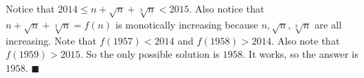 
Notice that $2014\le n+\sqrt{n}+\sqrt[3]{n}<2015$. Also notice that $n+\sqrt{n}+\sqrt[3]{n}=f(n)$ is monotically increasing because $n,\sqrt{n},\sqrt[3]{n}$ are all increasing. Note that $f(1957)<2014$ and $f(1958)>2014$. Also note that $f(1959)>2015$. So the only possible solution is $1958$. It works, so the answer is $\boxed{1958}$. $\blacksquare$

